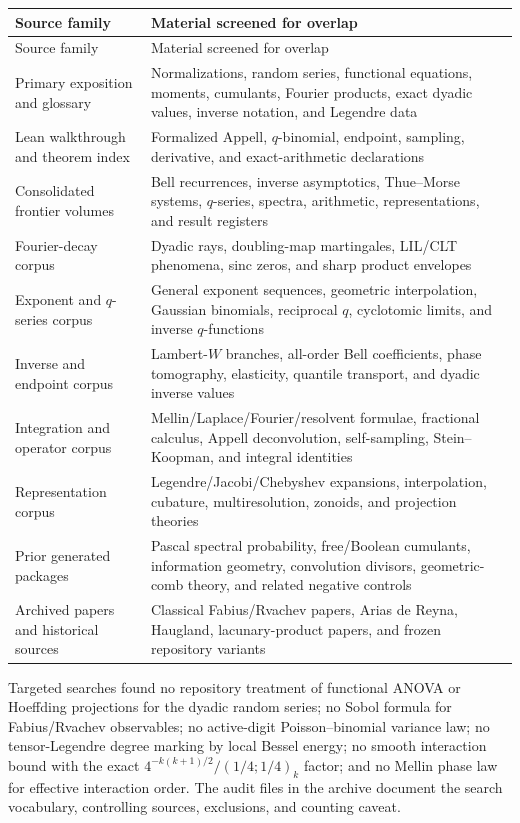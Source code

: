 \documentclass[11pt,oneside]{article}
\theoremstyle{definition}
\theoremstyle{remark}
\begin{document}
\begin{longtable}{@{}p{}p{}@{}}
\toprule
Source family & Material screened for overlap \\
\midrule
\endfirsthead
\toprule
Source family & Material screened for overlap \\
\midrule
\endhead
Primary exposition and glossary
& Normalizations, random series, functional equations, moments, cumulants,
Fourier products, exact dyadic values, inverse notation, and Legendre data \\
Lean walkthrough and theorem index
& Formalized Appell, $q$-binomial, endpoint, sampling, derivative, and exact-arithmetic declarations \\
Consolidated frontier volumes
& Bell recurrences, inverse asymptotics, Thue--Morse systems, $q$-series,
spectra, arithmetic, representations, and result registers \\
Fourier-decay corpus
& Dyadic rays, doubling-map martingales, LIL/CLT phenomena, sinc zeros, and
sharp product envelopes \\
Exponent and $q$-series corpus
& General exponent sequences, geometric interpolation, Gaussian binomials,
reciprocal $q$, cyclotomic limits, and inverse $q$-functions \\
Inverse and endpoint corpus
& Lambert-$W$ branches, all-order Bell coefficients, phase tomography,
elasticity, quantile transport, and dyadic inverse values \\
Integration and operator corpus
& Mellin/Laplace/Fourier/resolvent formulae, fractional calculus, Appell
deconvolution, self-sampling, Stein--Koopman, and integral identities \\
Representation corpus
& Legendre/Jacobi/Chebyshev expansions, interpolation, cubature,
multiresolution, zonoids, and projection theories \\
Prior generated packages
& Pascal spectral probability, free/Boolean cumulants, information geometry,
convolution divisors, geometric-comb theory, and related negative controls \\
Archived papers and historical sources
& Classical Fabius/Rvachev papers, Arias de Reyna, Haugland, lacunary-product
papers, and frozen repository variants \\
\bottomrule
\end{longtable}

Targeted searches found no repository treatment of functional ANOVA or
Hoeffding projections for the dyadic random series; no Sobol formula for
Fabius/Rvachev observables; no active-digit Poisson--binomial variance law; no
tensor-Legendre degree marking by local Bessel energy; no smooth interaction
bound with the exact $4^{-k(k+1)/2}/(1/4;1/4)_k$ factor; and no Mellin phase
law for effective interaction order.  The audit files in the archive document
the search vocabulary, controlling sources, exclusions, and counting caveat.
\end{document}

